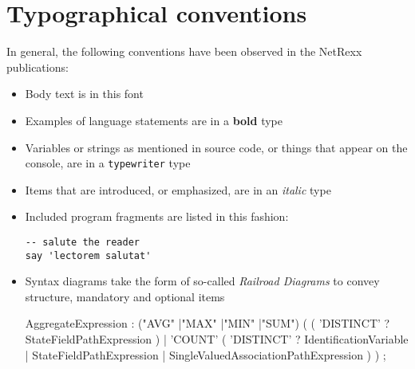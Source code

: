 \chapter{Typographical conventions}
In general, the following conventions have  been observed in the NetRexx publications:
\begin{itemize}
\item Body text is in this font
\item Examples of language statements are in a \textbf{bold} type
\item Variables or strings as mentioned in source code, or things that appear on the console, are in a \texttt{typewriter} type
\item Items that are introduced, or emphasized, are in an \emph{italic} type
\item Included program fragments are listed in this fashion:
\begin{lstlisting}[label=example,caption=Example Listing]
-- salute the reader
say 'lectorem salutat'
\end{lstlisting}
\item Syntax diagrams take the form of so-called \emph{Railroad Diagrams} to convey structure, mandatory and optional items
\begin{rail}
AggregateExpression : ("AVG" |"MAX" |"MIN" |"SUM")
 (
   (
    'DISTINCT' ?  StateFieldPathExpression
   ) | 'COUNT'
   (
    'DISTINCT' ?  IdentificationVariable
                  | StateFieldPathExpression
                  | SingleValuedAssociationPathExpression
   )
 )
   ;
\end{rail}
\end{itemize}